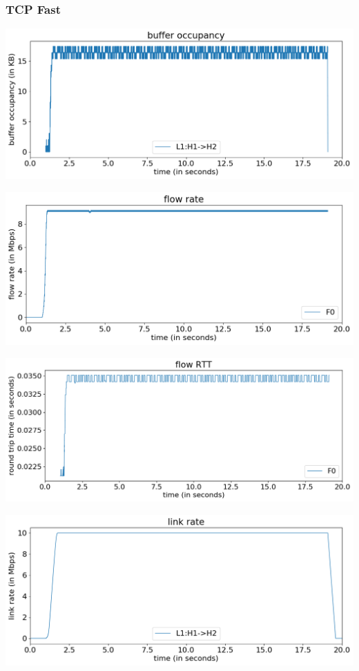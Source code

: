 \documentclass{article}
\begin{document}
\subsubsection{TCP Fast}

\includegraphics[width = \textwidth]{"test_case0_fast buffer occupancy"}

\includegraphics[width = \textwidth]{"test_case0_fast flow rate"}

\includegraphics[width = \textwidth]{"test_case0_fast flow RTT"}

\includegraphics[width = \textwidth]{"test_case0_fast link rate"}
\end{document}
